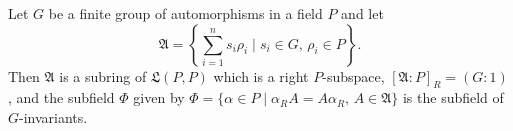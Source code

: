 Let $G$ be a finite group of automorphisms in a field $P$ and let
$$\mathfrak{A} = \left\{ \sum_{i=1}^{n} s_i \rho_i \mid s_i \in G, \, \rho_i \in P \right\}.$$
Then $\mathfrak{A}$ is a subring of $\mathfrak{L}(P,P)$ which is a right $P$-subspace, $[\mathfrak{A}:P]_R = (G:1)$, and the subfield $\Phi$ given by $\Phi = \{\alpha \in P \mid \alpha_R A = A \alpha_R, \, A \in \mathfrak{A}\}$ is the subfield of $G$-invariants.
